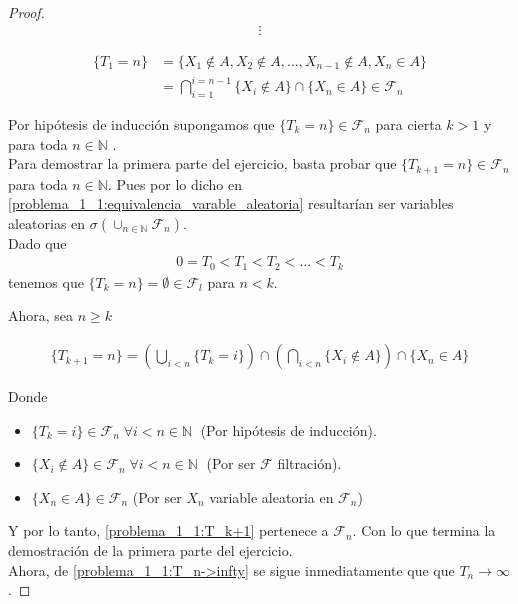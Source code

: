 \begin{proof}
	\begin{align*}
		\vdots
	\end{align*}
	
	\begin{align}
			\{T_1 = n\} 	&=	\{ X_1 \not\in A, X_2 \not\in A, \dots, X_{n-1} \not\in A, X_n \in A \} \\
							&= 	\bigcap_{i=1}^{i=n-1} \{ X_i \not\in A \} \cap \{X_n \in A \} \in \mathscr{F}_n
	\end{align} 
 
	Por hipótesis de inducción supongamos que $\{T_k = n\} \in \mathscr{F}_n$ para cierta $k>1$ 
	y para toda $n \in \mathbb{N}$ . \\

	Para demostrar la primera parte del ejercicio, basta probar que $\{T_{k+1} = n\} \in \mathscr{F}_n$ para 
	toda $n \in \mathbb{N}$. Pues por lo dicho en \eqref{problema_1_1:equivalencia_varable_aleatoria} resultarían ser 
	variables aleatorias en $\sigma(\cup_{n \in \mathbb{N}} \mathscr{F}_n)$.
	\\
	
	Dado que 
	\begin{align}\label{problema_1_1:T_n->infty}
		0=T_0<T_1<T_2<\dots<T_k
	\end{align}  
	tenemos que $\{ T_k = n\} = \emptyset \in \mathscr{F}_l$ para $n < k$. 
	
	Ahora, sea $n \geq k$
	
	\begin{align}\label{problema_1_1:T_k+1}
		\{ T_{k+1} = n\} = 
		\left( \bigcup_{i < n } \{T_k = i \} \right) 
		\cap 
		\left( \bigcap_{i < n} \{ X_i \not\in A \} \right)
		\cap
		\{ X_n \in A\}
	\end{align}
	
	
	Donde 
	\begin{itemize}
		\item	 $\{ T_k = i\} \in \mathscr{F}_n \; \forall i < n \in \mathbb{N} \; $ (Por hipótesis de inducción).	
		\item	 $\{ X_i \not \in A\} \in \mathscr{F}_n \; \forall i < n \in \mathbb{N} \;$ (Por ser $\mathscr{F}$ filtración).
		\item $\{ X_n \in A\} \in \mathscr{F}_n$ (Por ser $X_n$ variable aleatoria en $\mathscr{F}_n$)	
	\end{itemize}
	
	Y por lo tanto, \eqref{problema_1_1:T_k+1} pertenece a $\mathscr{F}_n$. Con lo que termina la demostración de la primera parte del ejercicio.\\
	
	Ahora, de \eqref{problema_1_1:T_n->infty} se sigue inmediatamente que que $T_n \rightarrow \infty$.
\end{proof}